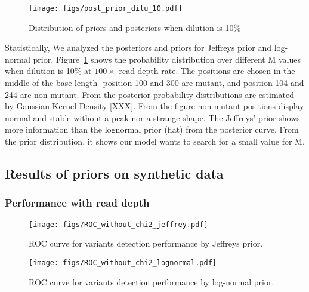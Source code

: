 \documentclass[11pt,reqno]{amsart}
\begin{document}
\begin{figure}[htbp]
\begin{center}
\texttt{[image: figs/post\_prior\_dilu\_10.pdf]}
\caption{Distribution of priors and posteriors when dilution is 10\%}
\label{fig:dilu_10}
\end{center}
\end{figure}

Statistically, We analyzed the posteriors and priors for Jeffreys prior and log-normal prior. Figure~\ref{fig:dilu_10} shows the probability distribution over different M values when dilution is 10\% at $100\times$ read depth rate. The positions are chosen in the middle of the base length- position 100 and 300 are mutant, and position 104 and 244 are non-mutant. From the posterior probability distributions are estimated by Gaussian Kernel Density [XXX]. From the figure non-mutant positions display normal and stable without a peak nor a strange shape. The Jeffreys' prior shows more information than the lognormal prior (flat) from the posterior curve. From the prior distribution, it shows our model wants to search for a small value for M.

\subsection{Results of priors on synthetic data}
\subsubsection{Performance with read depth}

\begin{figure}[htbp]
\begin{center}
\texttt{[image: figs/ROC\_without\_chi2\_jeffrey.pdf]}
\caption{ROC curve for variants detection performance by Jeffreys prior.}
\label{fig:ROC_jeffrey}
\end{center}
\end{figure}

\begin{figure}[htbp]
\begin{center}
\texttt{[image: figs/ROC\_without\_chi2\_lognormal.pdf]}
\caption{ROC curve for variants detection performance by log-normal prior.}
\label{fig:ROC_lognormal}
\end{center}
\end{figure}
\end{document}
